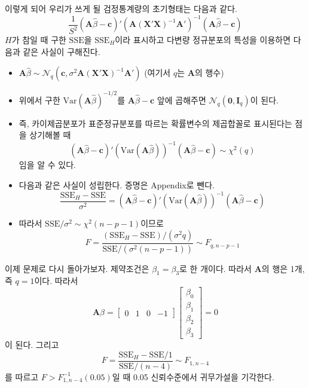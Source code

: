 \documentclass[answers]{exam}
\newcommand{\bs}{\boldsymbol}
\begin{document}
\begin{questions}
\begin{solution}
\begin{itemize}
    \end{itemize}
    이렇게 되어 우리가 쓰게 될 검정통계량의 초기형태는 다음과 같다.
    $$
      \dfrac{1}{S^{2}}\left(\mathbf{A}\widehat{\beta}-\mathbf{c}\right)'\left(\mathbf{A}\left(\mathbf{X}'\mathbf{X}\right)^{-1}\mathbf{A}'\right)^{-1}\left(\mathbf{A}\widehat{\beta}-\mathbf{c}\right)
    $$
    $H$가 참일 때 구한 $\mathrm{SSE}$을 $\mathrm{SSE}_{H}$이라 표시하고 다변량 정규분포의 특성을 이용하면 다음과 같은 사실이 구해진다.
    \begin{itemize}
      \item $\mathbf{A}\widehat{\beta} \sim \mathcal{N}_{q}\left(\mathbf{c},\sigma^{2}\mathbf{A}\left(\mathbf{X}'\mathbf{X}\right)^{-1}\mathbf{A}'\right)$ (여기서 $q$는 $\mathbf{A}$의 행수)
      \item 위에서 구한 $\mathrm{Var}\left(\mathbf{A}\widehat{\beta}\right)^{-1/2}$를 $\mathbf{A}\widehat{\beta}-\mathbf{c}$ 앞에 곱해주면 $\mathcal{N}_{q}\left(\bs{0},\mathbf{I}_{q}\right)$이 된다.
      \item 즉, 카이제곱분포가 표준정규분포를 따르는 확률변수의 제곱합꼴로 표시된다는 점을 상기해볼 때
      \begin{equation}
        \left(\mathbf{A}\widehat{\beta}-\mathbf{c}\right)'\left(\mathrm{Var}\left(\mathbf{A}\widehat{\beta}\right)\right)^{-1}\left(\mathbf{A}\widehat{\beta}-\mathbf{c}\right) \sim \chi^{2}\left(q\right)
      \end{equation}
      임을 알 수 있다.
      \item 다음과 같은 사실이 성립한다. 증명은 Appendix로 뺀다.
      \begin{equation}
        \dfrac{\mathrm{SSE}_{H}-\mathrm{SSE}}{\sigma^{2}} = \left(\mathbf{A}\widehat{\beta}-\mathbf{c}\right)'\left(\mathrm{Var}\left(\mathbf{A}\widehat{\beta}\right)\right)^{-1}\left(\mathbf{A}\widehat{\beta}-\mathbf{c}\right)
      \end{equation}
      \item 따라서 $\mathrm{SSE}/\sigma^{2}\sim \chi^{2}\left(n-p-1\right)$이므로
      $$
        F = \dfrac{\left(\mathrm{SSE}_{H}-\mathrm{SSE}\right)/\left(\sigma^{2}q\right)}{\mathrm{SSE}/\left(\sigma^{2}\left(n-p-1\right)\right)} \sim F_{q,n-p-1}
      $$
    \end{itemize}
    이제 문제로 다시 돌아가보자. 제약조건은 $\beta_{1}=\beta_{3}$로 한 개이다. 따라서 $\mathbf{A}$의 행은 1개, 즉 $q=1$이다. 따라서
    $$
      \mathbf{A}\beta = \begin{bmatrix}0 & 1 & 0 & -1 \end{bmatrix}\begin{bmatrix}\beta_{0}\\ \beta_{1} \\ \beta_{2} \\ \beta_{3}  \end{bmatrix} = 0
    $$
    이 된다. 그리고
    $$
      F = \dfrac{\mathrm{SSE}_{H}-\mathrm{SSE}/1}{\mathrm{SSE}/\left(n-4\right)}\sim F_{1,n-4}
    $$
    를 따르고 $F>F_{1,n-4}^{-1}\left(0.05\right)$일 때 0.05 신뢰수준에서 귀무가설을 기각한다.
   \end{solution}
   \end{questions}
   \newpage
   \appendix
\end{document}
